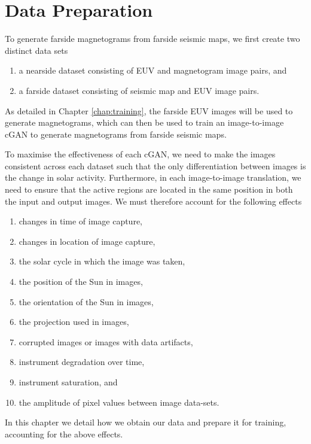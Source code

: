 \documentclass[11pt,a4paper,onecolumn]{report}
\begin{document}






%
%
%
%
\chapter{Data Preparation}
\label{chap:data}
%
%
%
%

To generate farside magnetograms from farside seismic maps, we first create two distinct
data sets
\begin{enumerate}
  \item a nearside dataset consisting of EUV and magnetogram image pairs, and
  \item a farside dataset consisting of seismic map and EUV image pairs.
\end{enumerate}
As detailed in Chapter \ref{chap:training}, the farside EUV images will be used
to generate magnetograms, which can then be used to train an image-to-image cGAN
to generate magnetograms from farside seismic maps. 


To maximise the effectiveness of each cGAN, we need to make the images consistent
across each dataset such that the only differentiation between images is the
change in solar activity. Furthermore, in each image-to-image translation, we
need to ensure that the active regions are located in the same position in both the
input and output images. We must therefore account for the following effects
\begin{enumerate}[i]
  \item changes in time of image capture, 
  \item changes in location of image capture,
  \item the solar cycle in which the image was taken,
  \item the position of the Sun in images,
  \item the orientation of the Sun in images,
  \item the projection used in images,
  \item corrupted images or images with data artifacts,
  \item instrument degradation over time,
  \item instrument saturation, and
  \item the amplitude of pixel values between image data-sets.
\end{enumerate}
In this chapter we detail how we obtain our data and prepare it for training,
accounting for the above effects.
\end{document}
